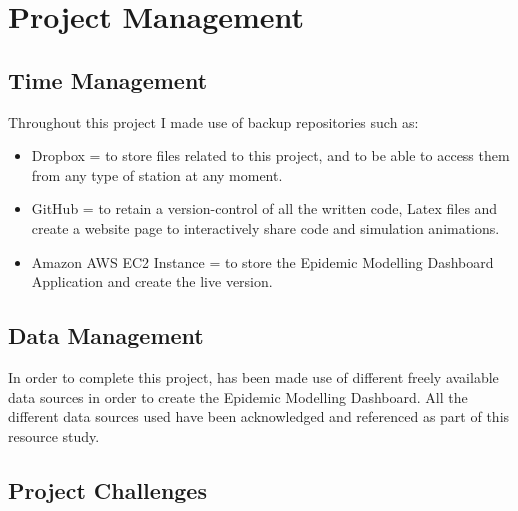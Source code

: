 \chapter{Project Management}

\label{ch:management}
\setlength\lineskip{0pt}
\vspace*{15pt}

\section{Time Management}
Throughout this project I made use of backup repositories such as:

\begin{itemize}
\itemsep0em
\item Dropbox = to store files related to this project, and to be able to access them from any type of station at any moment.
\item GitHub = to retain a version-control of all the written code, Latex files and create a website page to interactively share code and simulation animations.
\item Amazon AWS EC2 Instance = to store the Epidemic Modelling Dashboard Application and create the live version.
\end{itemize}




\section{Data Management}
In order to complete this project, has been made use of different freely available data sources in order to create the Epidemic Modelling Dashboard. All the different data sources used have been acknowledged and referenced as part of this resource study. 

\section{Project Challenges}